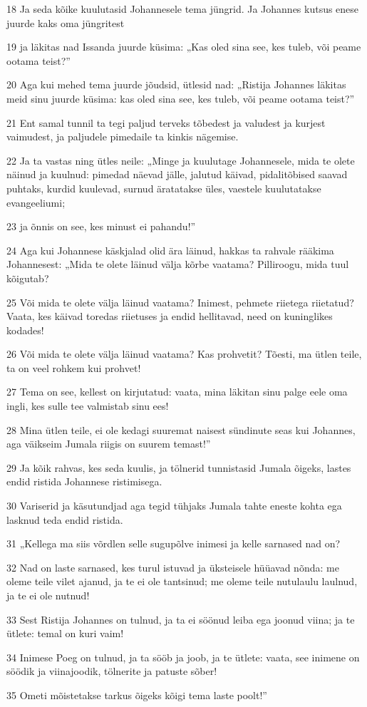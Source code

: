 \par 18 Ja seda kõike kuulutasid Johannesele tema jüngrid. Ja Johannes kutsus enese juurde kaks oma jüngritest
\par 19 ja läkitas nad Issanda juurde küsima: „Kas oled sina see, kes tuleb, või peame ootama teist?”
\par 20 Aga kui mehed tema juurde jõudsid, ütlesid nad: „Ristija Johannes läkitas meid sinu juurde küsima: kas oled sina see, kes tuleb, või peame ootama teist?”
\par 21 Ent samal tunnil ta tegi paljud terveks tõbedest ja valudest ja kurjest vaimudest, ja paljudele pimedaile ta kinkis nägemise.
\par 22 Ja ta vastas ning ütles neile: „Minge ja kuulutage Johannesele, mida te olete näinud ja kuulnud: pimedad näevad jälle, jalutud käivad, pidalitõbised saavad puhtaks, kurdid kuulevad, surnud äratatakse üles, vaestele kuulutatakse evangeeliumi;
\par 23 ja õnnis on see, kes minust ei pahandu!”
\par 24 Aga kui Johannese käskjalad olid ära läinud, hakkas ta rahvale rääkima Johannesest: „Mida te olete läinud välja kõrbe vaatama? Pilliroogu, mida tuul kõigutab?
\par 25 Või mida te olete välja läinud vaatama? Inimest, pehmete riietega riietatud? Vaata, kes käivad toredas riietuses ja endid hellitavad, need on kuninglikes kodades!
\par 26 Või mida te olete välja läinud vaatama? Kas prohvetit? Tõesti, ma ütlen teile, ta on veel rohkem kui prohvet!
\par 27 Tema on see, kellest on kirjutatud: vaata, mina läkitan sinu palge eele oma ingli, kes sulle tee valmistab sinu ees!
\par 28 Mina ütlen teile, ei ole kedagi suuremat naisest sündinute seas kui Johannes, aga väikseim Jumala riigis on suurem temast!”
\par 29 Ja kõik rahvas, kes seda kuulis, ja tölnerid tunnistasid Jumala õigeks, lastes endid ristida Johannese ristimisega.
\par 30 Variserid ja käsutundjad aga tegid tühjaks Jumala tahte eneste kohta ega lasknud teda endid ristida.
\par 31 „Kellega ma siis võrdlen selle sugupõlve inimesi ja kelle sarnased nad on?
\par 32 Nad on laste sarnased, kes turul istuvad ja üksteisele hüüavad nõnda: me oleme teile vilet ajanud, ja te ei ole tantsinud; me oleme teile nutulaulu laulnud, ja te ei ole nutnud!
\par 33 Sest Ristija Johannes on tulnud, ja ta ei söönud leiba ega joonud viina; ja te ütlete: temal on kuri vaim!
\par 34 Inimese Poeg on tulnud, ja ta sööb ja joob, ja te ütlete: vaata, see inimene on söödik ja viinajoodik, tölnerite ja patuste sõber!
\par 35 Ometi mõistetakse tarkus õigeks kõigi tema laste poolt!”

